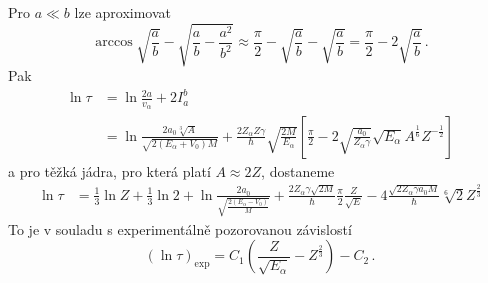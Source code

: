 \begin{solution}
	\begin{note}
		Pro $a\ll b$ lze aproximovat
		\begin{equation}
			\arccos{\sqrt{\frac{a}{b}}}-\sqrt{\frac{a}{b}-\frac{a^{2}}{b^{2}}}\approx\frac{\pi}{2}-\sqrt{\frac{a}{b}}-\sqrt{\frac{a}{b}}=\frac{\pi}{2}-2\sqrt{\frac{a}{b}}\,.
		\end{equation}
		Pak
		\begin{align}
			\ln\tau
				&=\ln{\frac{2a}{v_{\alpha}}}+2I_{a}^{b}\nonumber\\
				&=\ln{\frac{2a_{0}\sqrt[3]{A}}{\sqrt{2\left(E_{\alpha}+V_{0}\right){M}}}}
					+\frac{2Z_{\alpha}Z\gamma}{\hbar}\sqrt{\frac{2M}{E_{\alpha}}}\left[\frac{\pi}{2}-2\sqrt{\frac{a_{0}}{Z_{\alpha}\gamma}}\sqrt{E_{\alpha}}A^{\frac{1}{6}}Z^{-\frac{1}{2}}\right]
		\end{align}
		a pro těžká jádra, pro která platí $A\approx 2Z$, dostaneme
		\begin{align}
			\ln\tau&=\frac{1}{3}\ln{Z}+\frac{1}{3}\ln{2}+\ln{\frac{2a_{0}}{\sqrt{\frac{2\left(E_{\alpha}-V_{0}\right)}{M}}}}+\frac{2Z_{\alpha}\gamma\sqrt{2M}}{\hbar}\frac{\pi}{2}\frac{Z}{\sqrt{E}}
				-4\frac{\sqrt{2Z_{\alpha}\gamma a_{0}M}}{\hbar}\sqrt[6]{2}Z^{\frac{2}{3}}
		\end{align}
		To je v souladu s experimentálně pozorovanou závislostí
		\begin{equation}
			(\ln{\tau})_{\mathrm{exp}}=C_{1}\left(\frac{Z}{\sqrt{E_{\alpha}}}-Z^{\frac{2}{3}}\right)-C_{2}\,.
		\end{equation}
	\end{note}
\end{solution}
